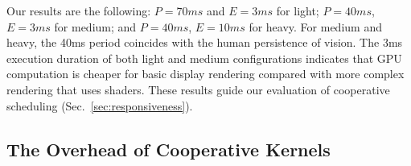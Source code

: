 \documentclass[sigconf]{acmart}
\newcommand{\mytablong}{Table~}
\newcommand{\mysec}{Sec.~}
\begin{document}
{Our results are the following: $P=70ms$ and $E=3ms$ for light;
$P=40ms$, $E=3ms$ for medium; and $P=40ms$, $E=10ms$ for heavy. For
medium and heavy, the 40ms period coincides with the human persistence
of vision. The 3ms execution duration of both light and medium
configurations indicates that GPU computation is cheaper for basic
display rendering compared with more complex rendering that uses
shaders. These results guide our evaluation of cooperative scheduling
(\mysec\ref{sec:responsiveness}).



\subsection{The Overhead of Cooperative Kernels}\label{sec:overhead}


}
\end{document}
